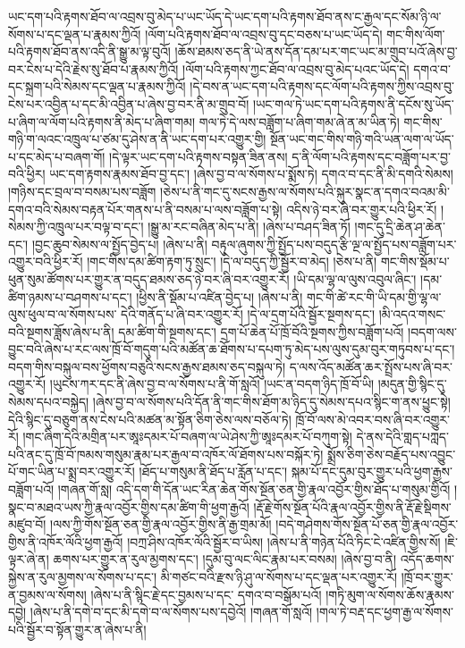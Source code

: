 ཡང་དག་པའི་རྟགས་ཐོབ་ལ་འབྲས་བུ་མེད་པ་ཡང་ཡོད་དེ་ཡང་དག་པའི་རྟགས་ཐོབ་ནས་ང་རྒྱལ་དང་སོམ་ཉི་ལ་སོགས་པ་དང་ལྡན་པ་རྣམས་ཀྱིའོ། །ལོག་པའི་རྟགས་ཐོབ་ལ་འབྲས་བུ་དང་བཅས་པ་ཡང་ཡོད་དེ། གང་གིས་ལོག་པའི་རྟགས་ཐོབ་ནས་འདི་​ ནི་སྒྱུ་མ་ལྟ་བུའོ། །ཆོས་ཐམས་ཅད་ནི་ཡེ་ནས་དོན་དམ་པར་གང་ཡང་མ་གྲུབ་པའོ་ཞེས་བྱ་བར་ངེས་པ་དེའི་རྗེས་སུ་ཐོབ་པ་རྣམས་ཀྱིའོ། །ལོག་པའི་རྟགས་ཀྱང་ཐོབ་ལ་འབྲས་བུ་མེད་པའང་ཡོད་དེ། དགའ་བ་དང་སྐྲག་པའི་སེམས་དང་ལྡན་པ་རྣམས་ཀྱིའོ། །དེ་བས་ན་ཡང་དག་པའི་རྟགས་དང་ལོག་པའི་རྟགས་ཀྱིས་འབྲས་བུ་ངེས་པར་འབྱིན་པ་དང་མི་འབྱིན་པ་ཞེས་བྱ་བར་ནི་མ་གྲུབ་བོ། །ཡང་གལ་ཏེ་ཡང་དག་པའི་རྟགས་ནི་དངོས་སུ་ཡོད་པ་ཞིག་ལ་ལོག་པའི་རྟགས་ནི་མེད་པ་ཞིག་གམ། གལ་ཏེ་དེ་ལས་བཟློག་པ་ཞིག་གམ་ཞེ་ན་མ་ཡིན་ཏེ། གང་གིས་གཉི་ག་ལའང་འཁྲུལ་པ་ཙམ་དུ་ཤེས་ན་ནི་ཡང་དག་པར་འགྱུར་གྱི། སྔོན་ཡང་གང་གིས་གཉི་གའི་ཡན་ལག་ལ་ཡོད་པ་དང་མེད་པ་བཞག་གོ། །དེ་ལྟར་ཡང་དག་པའི་རྟགས་བསྟན་ཟིན་ནས། ད་ནི་ལོག་པའི་རྟགས་དང་བཟློག་པར་བྱ་བའི་ཕྱིར། ཡང་དག་རྟགས་རྣམས་ཐོབ་བྱ་དང་། །ཞེས་བྱ་བ་ལ་སོགས་པ་སྨོས་ཏེ། དགའ་བ་དང་ནི་མི་དགའི་སེམས། །གཉིས་དང་བྲལ་བ་བསམ་པས་བཟློག །ཅེས་པ་ནི་གང་དུ་སངས་རྒྱས་ལ་སོགས་པའི་སྐུར་སྣང་ན་དགའ་བའམ་མི་དགའ་བའི་སེམས་བརྟན་པོར་གནས་པ་ནི་བསམ་པ་ལས་བཟློག་པ་སྟེ། འདིས་ཉེ་བར་ཞི་བར་གྱུར་པའི་ཕྱིར་རོ། །སེམས་ཀྱི་འཁྲུལ་པར་བལྟ་བ་དང་། །སྒྱུ་མ་རང་བཞིན་མེད་པ་ནི། །ཞེས་པ་བཤད་ཟིན་ཏོ། །གང་དུ་དྲི་ཆེན་ཤ་ཆེན་དང་། །བྱང་ཆུབ་སེམས་ལ་སྤྱོད་བྱེད་པ། །ཞེས་པ་ནི། བརྟུལ་ཞུགས་ཀྱི་སྤྱོད་པས་བདུད་རྩི་ལྔ་ལ་སྤྱོད་པས་བཟློག་པར་འགྱུར་བའི་ཕྱིར་རོ། །གང་གིས་དམ་ཚིག་རྟག་ཏུ་སྲུང་། །དེ་ལ་བདུད་ཀྱི་སྦྱོར་བ་མེད། །ཅེས་པ་ནི། གང་གིས་སྡོམ་པ་ཕུན་སུམ་ཚོགས་པར་གྱུར་ན་བདུད་ཐམས་ཅད་ཉེ་བར་ཞི་བར་འགྱུར་རོ། །ཡི་དམ་ལྷ་ལ་ལུས་འབུལ་ཞིང་། །དམ་ཚིག་ཉམས་པ་བཤགས་པ་དང་། །ཕྱིས་ནི་སྡོམ་པ་འཛིན་བྱེད་པ། །ཞེས་པ་ནི། གང་གི་ཚེ་རང་གི་ཡི་དམ་གྱི་ལྷ་ལ་ལུས་ཕུལ་བ་ལ་སོགས་པས་​ དེའི་གནོད་པ་ཞི་བར་འགྱུར་རོ། །དེ་ལ་དྲག་པོའི་སྦྱོར་སྔགས་དང་། །མི་འདའ་གསང་བའི་སྔགས་ཟློས་ཞེས་པ་ནི། དམ་ཚིག་གི་སྔགས་དང་། དྲག་པོ་ཆེན་པོ་ཁྲོ་བོའི་སྔགས་ཀྱིས་བཟློག་པའོ། །བདག་ལས་བྱུང་བའི་ཞེས་པ་རང་ལས་ཁྲོ་བོ་གདུག་པའི་མཚོན་ཆ་ཐོགས་པ་དཔག་ཏུ་མེད་པས་ལུས་དུམ་བུར་གཏུབས་པ་དང་། བདག་གིས་བསྐུལ་བས་ཕྱོགས་བཅུའི་སངས་རྒྱས་ཐམས་ཅད་བསྐུལ་ཏེ། ད་ལས་འོད་མཚོན་ཆར་སྤྲོས་པས་ཞི་བར་འགྱུར་རོ། །ཡུངས་ཀར་དང་ནི་ཞེས་བྱ་བ་ལ་སོགས་པ་ནི་གོ་སླའོ། །ཡང་ན་བདག་ཉིད་ཁྲོ་བོ་ཡི། །མདུན་གྱི་སྙིང་དུ་སེམས་དཔའ་བསྐྱེད། །ཞེས་བྱ་བ་ལ་སོགས་པའི་དོན་ནི་གང་གིས་ཐོག་མ་ཉིད་དུ་སེམས་དཔའ་སྙིང་ག་ནས་ཕྱུང་སྟེ། དེའི་སྙིང་དུ་བཅུག་ནས་ངེས་པའི་མཚན་མ་སྟོན་ཅིག་ཅེས་ལས་བཅོལ་ཏེ། ཁྲོ་བོ་ལས་མེ་འབར་བས་ཞི་བར་འགྱུར་རོ། །གང་ཞིག་དེའི་མགྲིན་པར་ཨཱཿདམར་པོ་བཞག་ལ་ཡེ་ཤེས་ཀྱི་ཨཱཿདམར་པོ་བཀུག་སྟེ། དེ་ནས་དེའི་{གླད་པཀླད་པ}འི་ནང་དུ་ཁྲོ་བོ་ཁམས་གསུམ་རྣམ་པར་རྒྱལ་བ་འཁོར་ལོ་ཐོགས་པས་བསྐོར་ཏེ། སྨྲོས་ཅིག་ཅེས་བརྗོད་པས་འབྱུང་པོ་གང་ཡིན་པ་སྨྲ་བར་འགྱུར་རོ། །ཐོད་པ་གསུམ་ནི་ཐོད་པ་རློན་པ་དང་། སྐམ་པོ་དང་དུམ་བུར་གྱུར་པའི་ཕྱག་རྒྱས་བཟློག་པའོ། །གཞན་གོ་སླ། འདི་དག་གི་དོན་ཡང་རིན་ཆེན་གོས་སྔོན་ཅན་གྱི་རྣལ་འབྱོར་གྱིས་ཐོད་པ་གསུམ་གྱིའོ། །སྣང་བ་མཐའ་ཡས་ཀྱི་རྣལ་འབྱོར་གྱིས་དམ་ཚིག་གི་ཕྱག་རྒྱའོ། །རྡོ་རྗེ་གོས་སྔོན་པོའི་རྣལ་འབྱོར་གྱིས་ནི་རྡོ་རྗེ་སྡིགས་མཛུབ་བོ། །ལས་ཀྱི་གོས་སྔོན་ཅན་གྱི་རྣལ་འབྱོར་གྱིས་ནི་རྒྱ་གྲམ་མོ། །བདེ་གཤེགས་གོས་སྔོན་པོ་ཅན་གྱི་རྣལ་འབྱོར་གྱིས་ནི་འཁོར་ལོའི་ཕྱག་རྒྱའོ། །བཀྲ་ཤིས་འཁོར་ལོའི་སྦྱོར་བ་ཡིས། །ཞེས་པ་ནི་གཉེན་པོའི་ཏིང་ངེ་འཛིན་གྱིས་སོ། །ཇི་ལྟར་ཞེ་ན། ཆགས་པར་གྱུར་ན་རུལ་མྱགས་དང་། །དུམ་བུ་ལང་ལིང་རྣམ་པར་བསམ། །ཞེས་བྱ་བ་ནི། འདོད་ཆགས་སྐྱེས་ན་རུལ་མྱགས་ལ་སོགས་པ་དང་། མི་གཙང་བའི་རྫས་ཉི་ཤུ་ལ་སོགས་པ་དང་ལྡན་པར་འགྱུར་རོ། །ཁྲོ་བར་གྱུར་ན་བྱམས་ལ་སོགས། །ཞེས་པ་ནི་སྙིང་རྗེ་དང་བྱམས་པ་དང་​ དགའ་བ་བསྒོམ་པའོ། །གཏི་མུག་ལ་སོགས་ཆོས་རྣམས་དབྱེ། །ཞེས་པ་ནི་དགེ་བ་དང་མི་དགེ་བ་ལ་སོགས་པས་དབྱེའོ། །གཞན་གོ་སླའོ། །གལ་ཏེ་བརྡ་དང་ཕྱག་རྒྱ་ལ་སོགས་པའི་སྦྱོར་བ་སྟོན་གྱུར་ན་ཞེས་པ་ནི། 